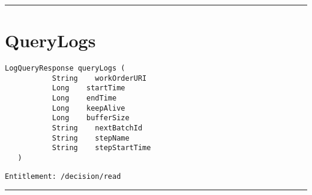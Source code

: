 \rule{12cm}{2pt}
\section{QueryLogs}
\label{Api:QueryLogs}
\begin{lstlisting}[style=nonumbers]
   LogQueryResponse queryLogs (
           String    workOrderURI
           Long    startTime
           Long    endTime
           Long    keepAlive
           Long    bufferSize
           String    nextBatchId
           String    stepName
           String    stepStartTime
   )
\end{lstlisting}
\begin{Verbatim}[formatcom=\color{Maroon}]
  Entitlement: /decision/read
\end{Verbatim}



\rule{12cm}{2pt}
